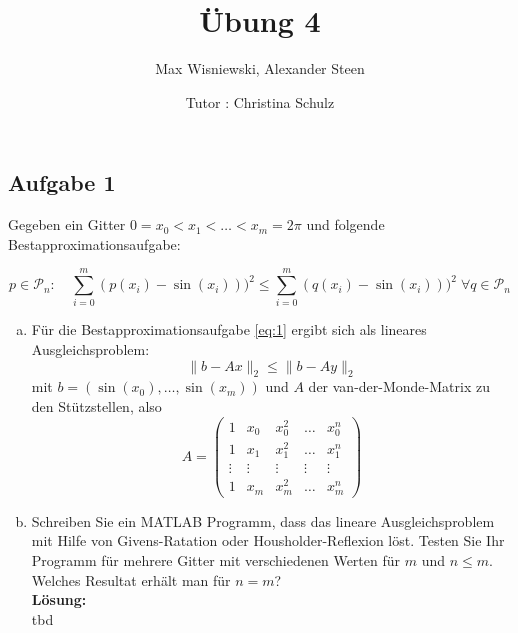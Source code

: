 \documentclass[11pt,a4paper,ngerman]{article}
\date{Tutor : Christina Schulz}
\title{Übung 4}
\author{Max Wisniewski, Alexander Steen}
\begin{document}

\renewcommand{\figurename}{Figure}

\maketitle
\thispagestyle{fancy}

\subsection*{Aufgabe 1}
Gegeben ein Gitter $0 = x_0 < x_1 < \ldots < x_m = 2 \pi$ und folgende Bestapproximationsaufgabe:

\begin{equation} \label{eq:1}
 p \in \mathcal{P}_n: \quad \sum_{i=0}^m {\left(p(x_i) - \sin(x_i) \right))^2} \leq \sum_{i=0}^m {\left(q(x_i) - \sin(x_i) \right))^2} \; \forall q \in \mathcal{P}_n
\end{equation}

\begin{enumerate}[a)]
\item Für die Bestapproximationsaufgabe \ref{eq:1} ergibt sich als lineares Ausgleichsproblem:
\begin{equation}
\|b - Ax \|_2 \leq \|b - Ay \|_2
\end{equation}
mit $b = \left(\sin(x_0),\ldots,\sin(x_m) \right)$ und $A$ der van-der-Monde-Matrix zu den Stützstellen, also
$$ A = \left( \begin{array}{ccccc} 1 & x_0 & x_0^2 & \ldots & x_0^n \\
  1 & x_1 & x_1^2 & \ldots & x_1^n \\
  \vdots & \vdots & \vdots &\vdots & \vdots \\
  1 & x_m & x_m^2 & \ldots & x_m^n \end{array} \right)$$
\item Schreiben Sie ein MATLAB Programm, dass das lineare Ausgleichsproblem mit Hilfe von Givens-Ratation oder Housholder-Reflexion löst.
Testen Sie Ihr Programm für mehrere Gitter mit verschiedenen Werten für $m$ und $n \leq m$. Welches Resultat erhält man für $n = m$?\\

\textbf{Lösung:}\\

tbd

\end{enumerate}
\end{document}
